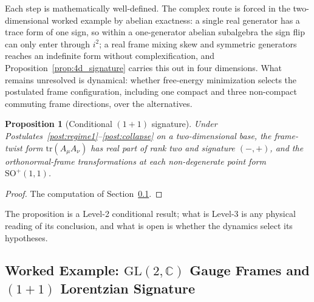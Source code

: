 \documentclass[11pt]{article}
\newtheorem{proposition}{Proposition}
\begin{document}
Each step is mathematically well-defined. The complex route is forced in the two-dimensional worked example by abelian exactness: a single real generator has a trace form of one sign, so within a one-generator abelian subalgebra the sign flip can only enter through $i^2$; a real frame mixing skew and symmetric generators reaches an indefinite form without complexification, and Proposition~\ref{prop:4d_signature} carries this out in four dimensions. What remains unresolved is dynamical: whether free-energy minimization selects the postulated frame configuration, including one compact and three non-compact commuting frame directions, over the alternatives.

\begin{proposition}[Conditional $(1{+}1)$ signature]\label{prop:conditional_signature}
Under Postulates~\ref{post:regime1}--\ref{post:collapse} on a two-dimensional base, the frame-twist form $\mathrm{tr}(A_\mu A_\nu)$ has real part of rank two and signature $(-,+)$, and the orthonormal-frame transformations at each non-degenerate point form $\mathrm{SO}^+(1,1)$.
\end{proposition}
\begin{proof}
The computation of Section~\ref{sec:worked_signature}.
\end{proof}
The proposition is a Level-2 conditional result; what is Level-3 is any physical reading of its conclusion, and what is open is whether the dynamics select its hypotheses.

\subsection{Worked Example: $\mathrm{GL}(2,\mathbb{C})$ Gauge Frames and $(1{+}1)$ Lorentzian Signature}
\label{sec:worked_signature}
\end{document}
